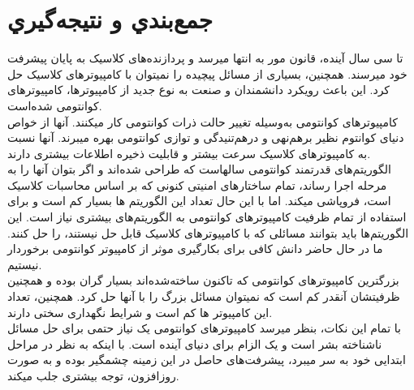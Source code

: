 \chapter{جمع‌بندي و نتيجه‌گيري}
تا سی سال آینده، قانون مور به انتها میرسد و پردازنده‌های کلاسیک به پایان پیشرفت خود میرسند. همچنین، بسیاری از مسائل پیچیده را نمیتوان با کامپیوترهای کلاسیک حل کرد. این باعث رویکرد دانشمندان و صنعت به نوع جدید از کامپیوترها، کامپیوترهای کوانتومی شده‌است.
\\
کامپیوترهای کوانتومی به‌وسیله تغییر حالت ذرات کوانتومی کار میکنند. آنها از خواص دنیای کوانتوم نظیر برهم‌نهی و درهم‌تنیدگی و توازی کوانتومی بهره میبرند. آنها نسبت به کامپیوترهای کلاسیک سرعت بیشتر و قابلیت ذخیره اطلاعات بیشتری دارند.
\\
الگوریتم‌های قدرتمند کوانتومی سالهاست که طراحی شده‌اند و اگر بتوان آنها را به مرحله اجرا رساند، تمام ساختارهای امنیتی کنونی که بر اساس محاسبات کلاسیک است، فروپاشی میکند. اما با این حال تعداد این الگوریتم ها بسیار کم است و برای استفاده از تمام ظرفیت کامپیوترهای کوانتومی به الگوریتم‌های بیشتری نیاز است. این الگوریتم‌ها باید بتوانند مسائلی که با کامپیوترهای کلاسیک قابل حل نیستند، را حل کنند. ما در حال حاضر دانش کافی برای بکارگیری موثر از کامپیوتر کوانتومی برخوردار نیستیم.
\\ 
بزرگترین کامپیوترهای کوانتومی که تاکنون ساخته‌شده‌اند بسیار گران بوده و همچنین ظرفیتشان آنقدر کم است که نمیتوان مسائل بزرگ را با آنها حل کرد. همچنین، تعداد این کامپیوتر ها کم است و شرایط نگهداری سختی دارند.
\\
با تمام این نکات، بنظر میرسد کامپیوترهای کوانتومی یک نیاز حتمی برای حل مسائل ناشناخته بشر است و یک الزام برای دنیای آینده است. با اینکه به نظر در مراحل ابتدایی خود به سر میبرد، پیشرفت‌های حاصل در این زمینه چشمگیر بوده و به صورت روزافزون، توجه بیشتری جلب میکند.